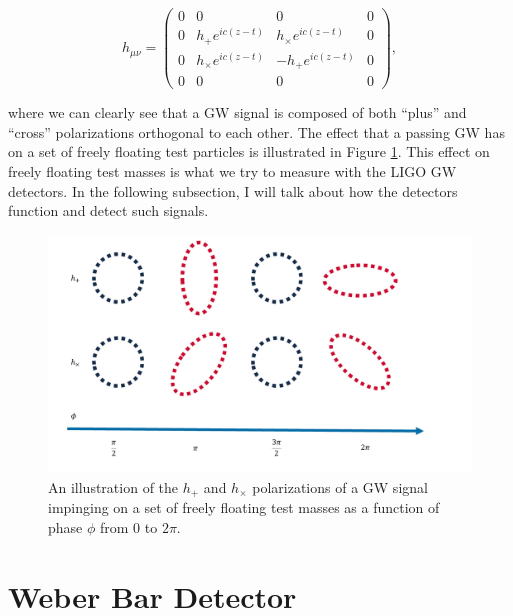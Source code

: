 \begin{equation}
  h_{\mu \nu} =   \begin{pmatrix}
0 & 0 & 0 & 0\\
0 & h_{+}e^{ic(z-t)} & h_{\times}e^{ic(z-t)} & 0\\
0 & h_{\times}e^{ic(z-t)} & -h_{+}e^{ic(z-t)} & 0\\
0 & 0 & 0 & 0
\end{pmatrix},
\end{equation}

where we can clearly see that a \ac{GW} signal is composed of both ``plus'' and ``cross'' polarizations orthogonal to each other. The effect that a passing \ac{GW} has on a set of freely floating test particles is illustrated in Figure \ref{fig:gw_plus_cross}. This effect on freely floating test masses is what we try to measure with the \ac{LIGO} \ac{GW} detectors. In the following subsection, I will talk about how the detectors function and detect such signals.

\begin{figure}
    \centering
    \includegraphics[width=\linewidth]{figures/GW_polarizations_thesis_figure.png}
    \caption{An illustration of the $h_+$ and $h_\times$ polarizations of a \ac{GW} signal impinging on a set of freely floating test masses as a function of phase $\phi$ from $0$ to $2\pi$.}
    \label{fig:gw_plus_cross}
\end{figure}


\section{Weber Bar Detector}

